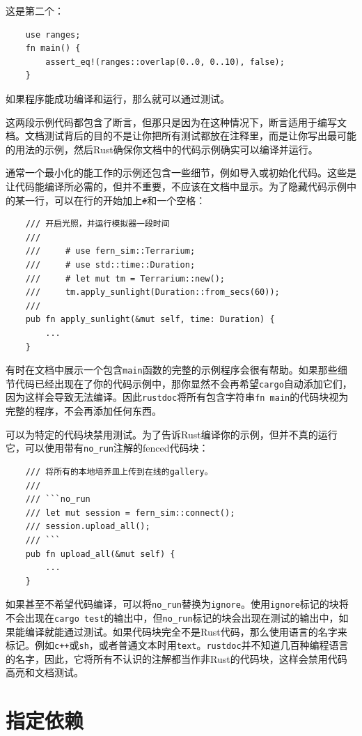 这是第二个：
\begin{verbatim}
    use ranges;
    fn main() {
        assert_eq!(ranges::overlap(0..0, 0..10), false);
    }
\end{verbatim}
如果程序能成功编译和运行，那么就可以通过测试。

这两段示例代码都包含了断言，但那只是因为在这种情况下，断言适用于编写文档。文档测试背后的目的不是让你把所有测试都放在注释里，而是让你写出最可能的用法的示例，然后Rust确保你文档中的代码示例确实可以编译并运行。

通常一个最小化的能工作的示例还包含一些细节，例如导入或初始化代码。这些是让代码能编译所必需的，但并不重要，不应该在文档中显示。为了隐藏代码示例中的某一行，可以在行的开始加上\texttt{\#}和一个空格：
\begin{verbatim}
    /// 开启光照，并运行模拟器一段时间
    ///
    ///     # use fern_sim::Terrarium;
    ///     # use std::time::Duration;
    ///     # let mut tm = Terrarium::new();
    ///     tm.apply_sunlight(Duration::from_secs(60));
    ///
    pub fn apply_sunlight(&mut self, time: Duration) {
        ...
    }
\end{verbatim}

有时在文档中展示一个包含\texttt{main}函数的完整的示例程序会很有帮助。如果那些细节代码已经出现在了你的代码示例中，那你显然不会再希望\texttt{cargo}自动添加它们，因为这样会导致无法编译。因此\texttt{rustdoc}将所有包含字符串\texttt{fn main}的代码块视为完整的程序，不会再添加任何东西。

可以为特定的代码块禁用测试。为了告诉Rust编译你的示例，但并不真的运行它，可以使用带有\texttt{no\_run}注解的fenced代码块：
\begin{verbatim}
    /// 将所有的本地培养皿上传到在线的gallery。
    ///
    /// ```no_run
    /// let mut session = fern_sim::connect();
    /// session.upload_all();
    /// ```
    pub fn upload_all(&mut self) {
        ...
    }
\end{verbatim}

如果甚至不希望代码编译，可以将\texttt{no\_run}替换为\texttt{ignore}。使用\texttt{ignore}标记的块将不会出现在\texttt{cargo test}的输出中，但\texttt{no\_run}标记的块会出现在测试的输出中，如果能编译就能通过测试。如果代码块完全不是Rust代码，那么使用语言的名字来标记。例如\texttt{c++}或\texttt{sh}，或者普通文本时用\texttt{text}。\texttt{rustdoc}并不知道几百种编程语言的名字，因此，它将所有不认识的注解都当作非Rust的代码块，这样会禁用代码高亮和文档测试。

\section{指定依赖}\label{depend}

